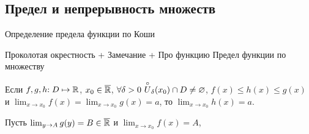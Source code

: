 \subsection{Предел и непрерывность множеств}


Определение предела функции по Коши

Проколотая окрестность
+ Замечание
+ Про функцию
Предел функции по множеству




\begin{theorem}
	Если $f, g, h{:}\; D \mapsto \mathbb{R}$, $x_0 \in \overline{\mathbb{R}}$, $\forall \delta > 0\ \overset{\circ}{U}_\delta(x_0) \cap D \ne \varnothing$, $f(x) \le h(x) \le g(x)$ и $\lim_{x \to x_0} f(x) = \lim_{x \to x_0} g(x) = a$, то $\lim_{x \to x_0} h(x) = a$.
\end{theorem}

Пусть $\lim_{y \to A} g(y) = B \in \overline{\mathbb{R}}$ и $\lim_{x \to x_0} f(x) = A$, 